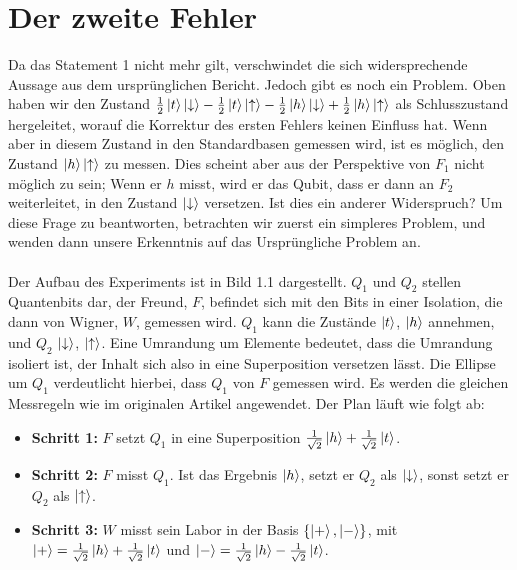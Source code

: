 \documentclass[a4paper]{article}
\begin{document}
\section*{Der zweite Fehler}
Da das Statement 1 nicht mehr gilt, verschwindet die sich widersprechende Aussage aus dem ursprünglichen Bericht. Jedoch gibt es noch ein Problem. Oben haben wir den Zustand $\frac{1}{2}\ket{t}\ket{\downarrow} - \frac{1}{2}\ket{t}\ket{\uparrow} - \frac{1}{2}\ket{h}\ket{\downarrow} + \frac{1}{2}\ket{h}\ket{\uparrow}$ als Schlusszustand hergeleitet, worauf die Korrektur des ersten Fehlers keinen Einfluss hat. Wenn aber in diesem Zustand in den Standardbasen gemessen wird, ist es möglich, den Zustand $\ket{h}\ket{\uparrow}$ zu messen. Dies scheint aber aus der Perspektive von $F_1$ nicht möglich zu sein; Wenn er $h$ misst, wird er das Qubit, dass er dann an $F_2$ weiterleitet, in den Zustand $\ket{\downarrow}$ versetzen. Ist dies ein anderer Widerspruch? Um diese Frage zu beantworten, betrachten wir zuerst ein simpleres Problem, und wenden dann unsere Erkenntnis auf das Ursprüngliche Problem an.\\\\
Der Aufbau des Experiments ist in Bild 1.1 dargestellt. $Q_1$ und $Q_2$ stellen Quantenbits dar, der Freund, $F$, befindet sich mit den Bits in einer Isolation, die dann von Wigner, $W$, gemessen wird. $Q_1$ kann die Zustände $\ket{t}$, $\ket{h}$ annehmen, und $Q_2$ $\ket{\downarrow}$, $\ket{\uparrow}$. Eine Umrandung um Elemente bedeutet, dass die Umrandung isoliert ist, der Inhalt sich also in eine Superposition versetzen lässt. Die Ellipse um $Q_1$ verdeutlicht hierbei, dass $Q_1$ von $F$ gemessen wird. Es werden die gleichen Messregeln wie im originalen Artikel angewendet. Der Plan läuft wie folgt ab:
\begin{itemize}
	\item \textbf{Schritt 1:} $F$ setzt $Q_1$ in eine Superposition $\frac{1}{\sqrt{2}} \ket{h} + \frac{1}{\sqrt{2}} \ket{t}$.
	\item \textbf{Schritt 2:} $F$ misst $Q_1$. Ist das Ergebnis $\ket{h}$, setzt er $Q_2$ als $\ket{\downarrow}$, sonst setzt er $Q_2$ als $\ket{\uparrow}$.
	\item \textbf{Schritt 3:} $W$ misst sein Labor in der Basis $\qty{\ket{+}, \ket{-}}$, mit $\ket{+} = \frac{1}{\sqrt{2}} \ket{h} + \frac{1}{\sqrt{2}} \ket{t}$ und $\ket{-} = \frac{1}{\sqrt{2}} \ket{h} - \frac{1}{\sqrt{2}} \ket{t}$.
\end{itemize}
\end{document}
